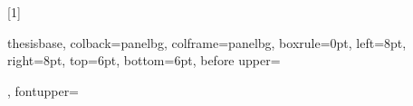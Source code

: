 %
[1]{%
  thesisbase, colback=panelbg, colframe=panelbg, boxrule=0pt,
  left=8pt, right=8pt, top=6pt, bottom=6pt,
  before upper={{\sffamily\fontsize{7.5}{9}\selectfont\bfseries\color{quietink}%
    }\par\vspace{0.4ex}},
  fontupper=\fontsize{10}{13}\selectfont}

